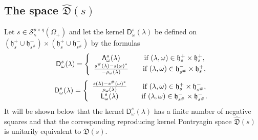 \documentclass[12pt,twoside,a4paper]{amsart}
\theoremstyle{definition}
\numberwithin{equation}{section}
\begin{document}
\subsection{The space ${{{\widehat {{\mathfrak D}}} }}(s)$}
 Let $s \in {\mathcal S}_{\kappa}^{p\times q}(\Omega_+)$ and let
the kernel ${\mathsf D}_{\omega}^s(\lambda)$ be defined on
$({\mathfrak h}_s^+\cup {\mathfrak h}_{s^{\#}}^-)\times
({\mathfrak h}_s^+\cup {\mathfrak h}_{s^{\#}}^-)$
by the formulas
\begin{equation}\label{DOL+}
    {\mathsf D}_{\omega}^s(\lambda)=\left\{\begin{array}{cc}
      {\mathsf \Lambda}_{\omega}^s(\lambda) &\quad \text{if}\ ({\lambda}, \omega)
\in{\mathfrak h}_{s}^+\times{\mathfrak h}_{s}^+,\\
     {{\displaystyle}\frac{s^{\#}(\lambda)- s({\omega})^*}{-\rho_{\omega}
    (\lambda)}} & \quad \text{if}\ ({\lambda}, \omega)\in{\mathfrak h}_{s^{\#}}^-
\times
{\mathfrak h}_{s}^+,
    \end{array}
    \right.
\end{equation}
\begin{equation}\label{DOL-}
    {\mathsf D}_{\omega}^s(\lambda)=\left\{\begin{array}{cc}
      {{\displaystyle}\frac{s(\lambda)- s^{\#}({\omega})^*}{\rho_{\omega}
    (\lambda)}}  & \quad \text{if}\ ({\lambda}, \omega)\in{\mathfrak h}_{s}^+\times
{\mathfrak h}_{s^{\#}}^-,\\
    {\mathsf L}_{\omega}^s(\lambda) & \quad \text{if}\ ({\lambda}, \omega)
\in{\mathfrak h}_{s^{\#}}^-\times{\mathfrak h}_{s^{\#}}^- .
    \end{array}
    \right.
\end{equation}
It will be shown below that the kernel ${\mathsf D}_{\omega}^s(\lambda)$ has a
finite number of negative squares and that the corresponding
reproducing kernel Pontryagin space ${{{\widehat {{\mathfrak D}}} }}(s)$ is unitarily equivalent to
${{{\mathfrak D}}(s)}$.
\end{document}
